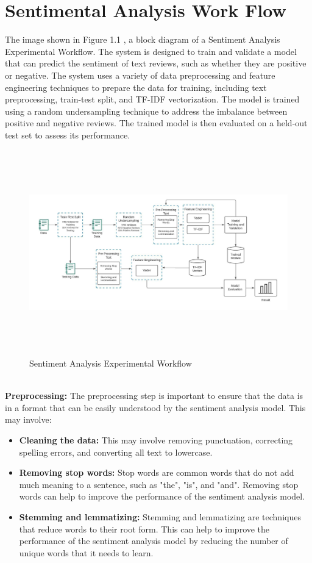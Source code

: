 \documentclass[a4paper, 12pt]{report}
\begin{document}
\section{Sentimental Analysis Work Flow}
The image shown in Figure 1.1 , a block diagram of a Sentiment Analysis Experimental Workflow. The system is designed to train and validate a model that can predict the sentiment of text reviews, such as whether they are positive or negative. The system uses a variety of data preprocessing and feature engineering techniques to prepare the data for training, including text preprocessing, train-test split, and TF-IDF vectorization. The model is trained using a random undersampling technique to address the imbalance between positive and negative reviews. The trained model is then evaluated on a held-out test set to assess its performance.
\begin{figure}[h]
	\includegraphics[height=3.5in,width=6in]{c}
	\caption{Sentiment Analysis Experimental Workflow }
	\label{Fig.}
\end{figure}\\
\textbf{Preprocessing:}
The preprocessing step is important to ensure that the data is in a format that can be easily understood by the sentiment analysis model. This may involve:
\begin{itemize}
	\item \textbf{Cleaning the data:} This may involve removing punctuation, correcting spelling errors, and converting all text to lowercase.
	\item \textbf{Removing stop words:} Stop words are common words that do not add much meaning to a sentence, such as "the", "is", and "and". Removing stop words can help to improve the performance of the sentiment analysis model.
	\item \textbf{Stemming and lemmatizing:} Stemming and lemmatizing are techniques that reduce words to their root form. This can help to improve the performance of the sentiment analysis model by reducing the number of unique words that it needs to learn.
\end{itemize}
\end{document}
